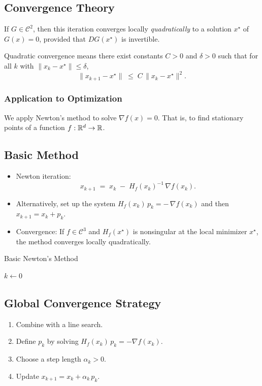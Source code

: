 \subsection*{Convergence Theory}
If \(G\in \mathcal{C}^2\), then this iteration converges locally \emph{quadratically} to
a solution \(x^\star\) of \(G(x) = 0\), provided that \(D G(x^\star)\) is invertible.

\begin{remark}
  Quadratic convergence means there exist constants \(C>0\) and \(\delta>0\) such that for all \(k\) with \(\|x_k - x^\star\|\le \delta\),
  \[
    \|x_{k+1} - x^\star\| \;\le\; C \,\|x_k - x^\star\|^2.
  \]
\end{remark}

\subsubsection*{Application to Optimization}

We apply Newton's method to solve \(\nabla f(x) = 0\). That is, to find stationary points of a function \(f:\mathbb{R}^d \to \mathbb{R}\).

\subsection*{Basic Method}
\begin{itemize}
  \item Newton iteration:
        \[
          x_{k+1} \;=\; x_k \;-\; H_f(x_k)^{-1} \,\nabla f(x_k).
        \]
  \item Alternatively, set up the system \(H_f(x_k)\,p_k = -\,\nabla f(x_k)\) and then \(x_{k+1} = x_k + p_k\).
  \item Convergence: If \(f\in \mathcal{C}^3\) and \(H_f(x^\star)\) is nonsingular at the local minimizer \(x^\star\), the method converges locally quadratically.
\end{itemize}

\begin{algorithm}[H]
  \caption{Basic Newton's Method}
  \label{alg:newton-basic}
  \(k \gets 0\)\;
  \;
\end{algorithm}

\subsection*{Global Convergence Strategy}
\begin{enumerate}
  \item Combine with a line search.
  \item Define \(p_k\) by solving \(H_f(x_k)\,p_k = -\nabla f(x_k)\).
  \item Choose a step length \(\alpha_k > 0\).
  \item Update \(x_{k+1} = x_k + \alpha_k \, p_k\).
\end{enumerate}

